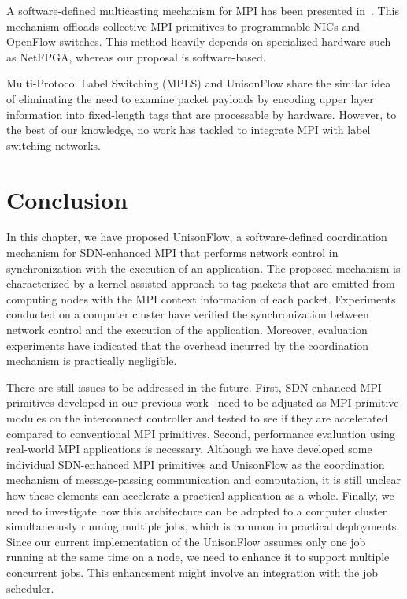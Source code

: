 A software-defined multicasting mechanism for MPI has been presented
in~\autocite{Arap2014}. This mechanism offloads collective MPI primitives to
programmable NICs and OpenFlow switches. This method heavily depends on
specialized hardware such as NetFPGA, whereas our proposal is software-based.

Multi-Protocol Label Switching (MPLS) and UnisonFlow share the similar
idea of eliminating the need to examine packet payloads by encoding
upper layer information into fixed-length tags that are processable by
hardware. However, to the best of our knowledge, no work has tackled to
integrate MPI with label switching networks.

\section{Conclusion}\label{iv-conclusion}

In this chapter, we have proposed UnisonFlow, a software-defined
coordination mechanism for SDN-enhanced MPI that performs network
control in synchronization with the execution of an application. The
proposed mechanism is characterized by a kernel-assisted approach to tag
packets that are emitted from computing nodes with the MPI context
information of each packet. Experiments conducted on a computer cluster
have verified the synchronization between network control and the
execution of the application. Moreover, evaluation experiments have
indicated that the overhead incurred by the coordination mechanism is
practically negligible.

There are still issues to be addressed in the future. First,
SDN-enhanced MPI primitives developed in our previous
work~\autocites{Dashdavaa2014}{Takahashi2014} need to be adjusted as MPI
primitive modules on the interconnect controller and tested to see if
they are accelerated compared to conventional MPI primitives. Second,
performance evaluation using real-world MPI applications is necessary.
Although we have developed some individual SDN-enhanced MPI primitives
and UnisonFlow as the coordination mechanism of message-passing
communication and computation, it is still unclear how these elements
can accelerate a practical application as a whole. Finally, we need to
investigate how this architecture can be adopted to a computer cluster
simultaneously running multiple jobs, which is common in practical
deployments. Since our current implementation of the UnisonFlow assumes
only one job running at the same time on a node, we need to enhance it
to support multiple concurrent jobs. This enhancement might involve an
integration with the job scheduler.
